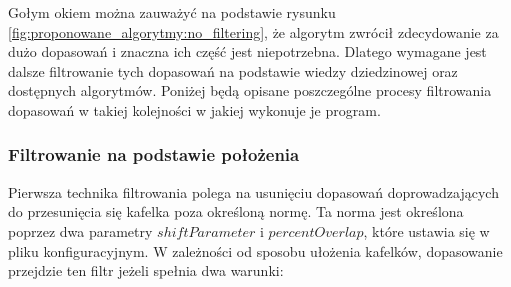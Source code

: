 Gołym okiem można zauważyć na podstawie rysunku \ref{fig:proponowane_algorytmy:no_filtering}, że algorytm zwrócił zdecydowanie za dużo dopasowań i znaczna ich część jest niepotrzebna. Dlatego wymagane jest dalsze filtrowanie tych dopasowań na podstawie wiedzy dziedzinowej oraz dostępnych algorytmów. Poniżej będą opisane poszczególne procesy filtrowania dopasowań w takiej kolejności w jakiej wykonuje je program.

\subsubsection{Filtrowanie na podstawie położenia}
\label{sec:proponowane_algorytmy:placement_filtering}

Pierwsza technika filtrowania polega na usunięciu dopasowań doprowadzających do przesunięcia się kafelka poza określoną normę. Ta norma jest określona poprzez dwa parametry $shiftParameter$ i $percentOverlap$, które ustawia się w pliku konfiguracyjnym. W zależności od sposobu ułożenia kafelków, dopasowanie przejdzie ten filtr jeżeli spełnia dwa warunki:

